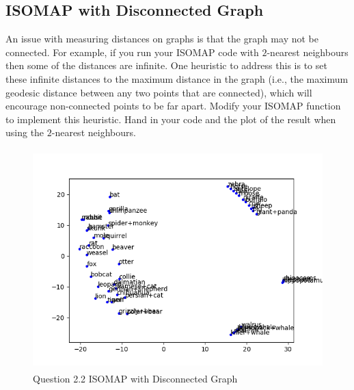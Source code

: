 \documentclass{article}
\def\blu#1{{\color{blu}#1}}
\begin{document}
\subsection{ISOMAP with Disconnected Graph}

An issue with measuring distances on graphs is that the graph may not be connected. For example, if you run your ISOMAP code with $2$-nearest neighbours then some of the distances are infinite. One heuristic to address this is to set these infinite distances to the maximum distance in the graph (i.e., the maximum geodesic distance between any two points that are connected), which will encourage non-connected points to be far apart. Modify your ISOMAP function to implement this heuristic. \blu{Hand in your code and the plot of the result when using the $2$-nearest neighbours}.

\begin{figure}[h!]
    \includegraphics[width=50em,height=8.5cm]{q2_2.png}
    \caption{Question 2.2 ISOMAP with Disconnected Graph}
    \label{fig:q2_2}
\end{figure}
\end{document}
